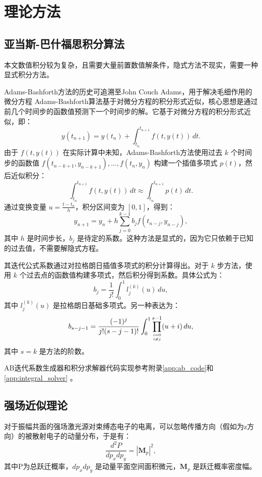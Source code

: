 \chapter{理论方法}

\section{亚当斯-巴什福思积分算法}

本文数值积分较为复杂，且需要大量前置数值解条件，隐式方法不现实，需要一种显式积分方法。

Adams-Bashforth方法的历史可追溯至John Couch Adams，用于解决毛细作用的微分方程
Adams-Bashforth算法基于对微分方程的积分形式近似，核心思想是通过前几个时间步的函数值预测下一个时间步的解。它基于对微分方程的积分形式近似，即：
\begin{equation}
y(t_{n+1}) = y(t_n) + \int_{t_n}^{t_{n+1}} f(t, y(t)) \, dt.
\end{equation}
由于 \(f(t, y(t))\) 在实际计算中未知，Adams-Bashforth方法使用过去 \(k\) 个时间步的函数值 \(f(t_{n-k+1}, y_{n-k+1}), \ldots, f(t_n, y_n)\) 构建一个插值多项式 \(p(t)\)，然后近似积分：
\begin{equation}
\int_{t_n}^{t_{n+1}} f(t, y(t)) \, dt \approx \int_{t_n}^{t_{n+1}} p(t) \, dt.
\end{equation}
通过变换变量 \(u = \frac{t - t_n}{h}\)，积分区间变为 \([0, 1]\)，得到：
\begin{equation}
y_{n+1} = y_n + h \sum_{j=0}^{k-1} b_j f(t_{n-j}, y_{n-j}),
\end{equation}
其中 \(h\) 是时间步长，\(b_j\) 是待定的系数。这种方法是显式的，因为它只依赖于已知的过去值，不需要解隐式方程。

其迭代公式系数通过对拉格朗日插值多项式的积分计算得出。对于 \(k\) 步方法，使用 \(k\) 个过去点的函数值构建多项式，然后积分得到系数。具体公式为：
\begin{equation}
b_j = \frac{1}{j!} \int_0^1 l_j^{(k)}(u) \, du,
\end{equation}
其中 \(l_j^{(k)}(u)\) 是拉格朗日基础多项式。另一种表达为：
\begin{equation}
b_{s-j-1} = \frac{(-1)^j}{j!(s-j-1)!} \int_0^1 \prod_{i=0 \atop i \neq j}^{s-1} (u+i) \, du,
\end{equation}
其中 \(s = k\) 是方法的阶数。

AB迭代系数生成器和积分求解器代码实现参考附录\ref{app:ab_code}和\ref{app:integral_solver} 。

\section{强场近似理论}
对于振幅共面的强场激光源对束缚态电子的电离，可以忽略传播方向（假如为z方向）的被散射电子的动量分布，于是有：
\begin{equation}
\frac{d^2P}{dp_x dp_y} = |\mathbf M_p|^2, \label{eq:trans amp}
\end{equation}
其中P为总跃迁概率，$dp_xdp_y$ 是动量平面空间面积微元，$\bm M_p$ 是跃迁概率密度幅。

